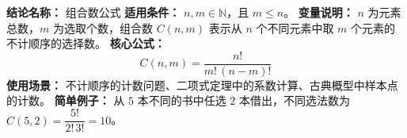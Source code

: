 \textbf{结论名称：} 组合数公式  
\textbf{适用条件：} $n,m\in\mathbb{N}$，且 $m\le n$。  
\textbf{变量说明：} $n$ 为元素总数，$m$ 为选取个数，组合数 $C(n,m)$ 表示从 $n$ 个不同元素中取 $m$ 个元素的不计顺序的选择数。  
\textbf{核心公式：}  
\[ \boxed{C(n,m)=\frac{n!}{m!\,(n-m)!}} \]  
\textbf{使用场景：} 不计顺序的计数问题、二项式定理中的系数计算、古典概型中样本点的计数。  
\textbf{简单例子：} 从 $5$ 本不同的书中任选 $2$ 本借出，不同选法数为 $C(5,2)=\dfrac{5!}{2!\,3!}=10$。